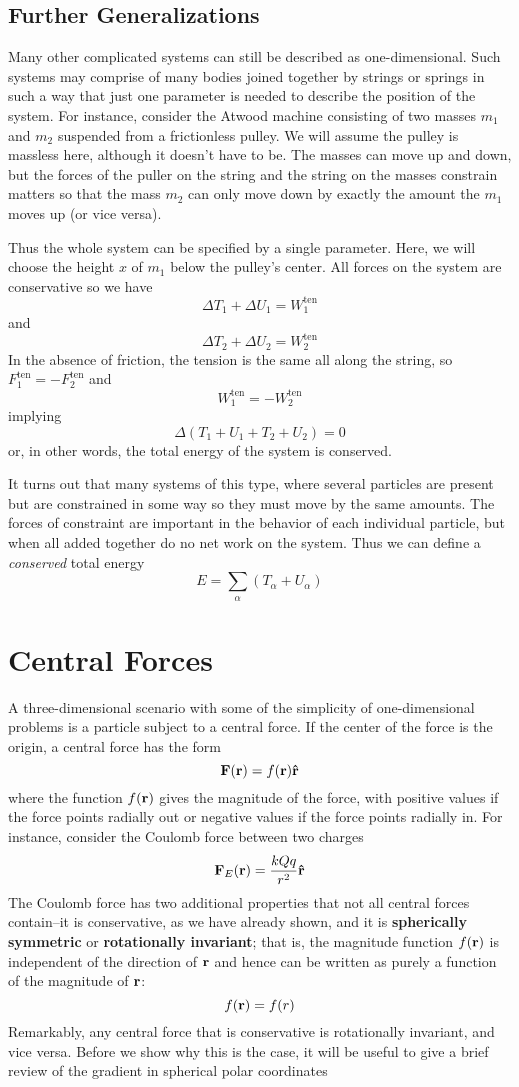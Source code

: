 \subsection*{Further Generalizations}
Many other complicated systems can still be described as one-dimensional. Such systems may comprise of many bodies joined together by strings or springs in such a way that just one parameter is needed to describe the position of the system. For instance, consider the Atwood machine consisting of two masses $m_1$ and $m_2$ suspended from a frictionless pulley. We will assume the pulley is massless here, although it doesn't have to be. The masses can move up and down, but the forces of the puller on the string and the string on the masses constrain matters so that the mass $m_2$ can only move down by exactly the amount the $m_1$ moves up (or vice versa).

Thus the whole system can be specified by a single parameter. Here, we will choose the height $x$ of $m_1$ below the pulley's center. All forces on the system are conservative so we have
\[ \Delta T_1 + \Delta U_1 = W_1^\text{ten} \]
and
\[ \Delta T_2 + \Delta U_2 = W_2^\text{ten} \]
In the absence of friction, the tension is the same all along the string, so $F_1^\text{ten} = -F_2^\text{ten}$ and
\[ W_1^\text{ten} = -W_2^\text{ten} \]
implying
\[ \Delta (T_1 + U_1 + T_2 + U_2) = 0\]
or, in other words, the total energy of the system is conserved. 

It turns out that many systems of this type, where several particles are present but are constrained in some way so they must move by the same amounts. The forces of constraint are important in the behavior of each individual particle, but when all added together do no net work on the system. Thus we can define a \textit{conserved} total energy
\[ E = \sum_\alpha (T_\alpha + U_\alpha) \]
\section{Central Forces}
A three-dimensional scenario with some of the simplicity of one-dimensional problems is a particle subject to a central force. If the center of the force is the origin, a central force has the form
\[ \mathbf{F}(\mathbf{r}) = f(\mathbf{r})\mathbf{\hat{r}} \]
where the function $f(\mathbf{r})$ gives the magnitude of the force, with positive values if the force points radially out or negative values if the force points radially in. For instance, consider the Coulomb force between two charges
\[ \mathbf{F}_E(\mathbf{r}) = \frac{kQq}{r^2}\mathbf{\hat{r}} \]
The Coulomb force has two additional properties that not all central forces contain--it is conservative, as we have already shown, and it is \textbf{spherically symmetric} or \textbf{rotationally invariant}; that is, the magnitude function $f(\mathbf{r})$ is independent of the direction of $\mathbf{r}$ and hence can be written as purely a function of the magnitude of $\mathbf{r}$:
\[ f(\mathbf{r}) = f(r) \]
Remarkably, any central force that is conservative is rotationally invariant, and vice versa. Before we show why this is the case, it will be useful to give a brief review of the gradient in spherical polar coordinates
